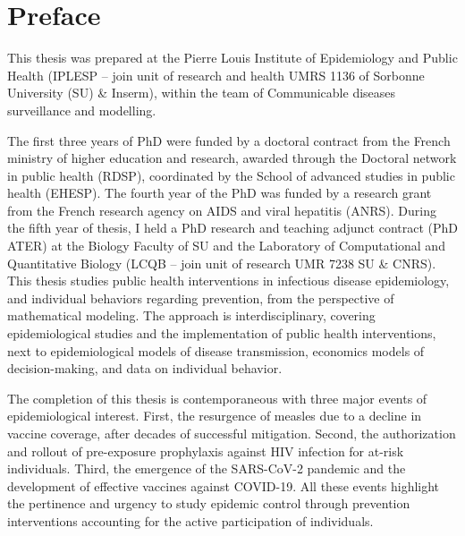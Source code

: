 \chapter*{Preface} 

This thesis was prepared at the Pierre Louis Institute of Epidemiology and Public Health (IPLESP -- join unit of research and health UMRS 1136 of Sorbonne University (SU) \& Inserm), within the team of Communicable diseases surveillance and modelling.

The first three years of PhD were funded by a doctoral contract from the French ministry of higher education and research, awarded through the Doctoral network in public health (RDSP), coordinated by the School of advanced studies in public health (EHESP). The fourth year of the PhD was funded by a research grant from the French research agency on AIDS and viral hepatitis (ANRS). During the fifth year of thesis, I held a PhD research and teaching adjunct contract (PhD ATER) at the Biology Faculty of SU and the Laboratory of Computational and Quantitative Biology (LCQB -- join unit of research UMR 7238 SU \& CNRS).\\

This thesis studies public health interventions in infectious disease epidemiology, and individual behaviors regarding prevention, from the perspective of mathematical modeling. The approach is interdisciplinary, covering epidemiological studies and the implementation of public health interventions, next to epidemiological models of disease transmission, economics models of decision-making, and data on individual behavior.

The completion of this thesis is contemporaneous with three major events of epidemiological interest. First, the resurgence of measles due to a decline in vaccine coverage, after decades of successful mitigation. Second, the authorization and rollout of pre-exposure prophylaxis against HIV infection for at-risk individuals. Third, the emergence of the SARS-CoV-2 pandemic and the development of effective vaccines against COVID-19. All these events highlight the pertinence and urgency to study epidemic control through prevention interventions accounting for the active participation of individuals. 


